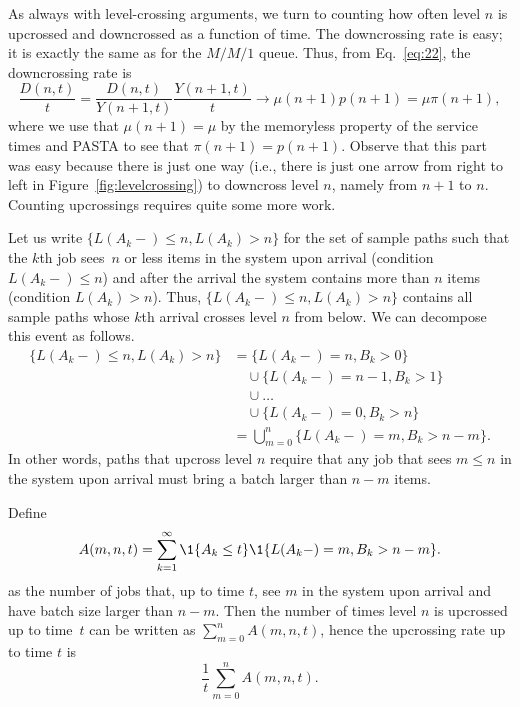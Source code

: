 As always with level-crossing arguments, we turn to counting how often
level $n$ is upcrossed and downcrossed as a function of time. The
downcrossing rate is easy; it is exactly the same as for the $M/M/1$
queue. Thus, from Eq.~\eqref{eq:22}, the downcrossing rate is
\begin{equation}
\frac{D(n,t)}t = \frac{D(n,t)}{Y(n+1,t)}\frac{Y(n+1,t)}t \to  \mu(n+1) p(n+1) = \mu \pi(n+1),
\end{equation}
where we use that $\mu(n+1) = \mu$ by the memoryless property of the
service times and PASTA to see that $\pi(n+1)=p(n+1)$.  Observe that
this part was easy because there is just one way (i.e., there is just
one arrow from right to left in Figure~\ref{fig:levelcrossing}) to
downcross level $n$, namely from $n+1$ to $n$. Counting upcrossings
requires quite some more work.

Let us write $\{L(A_k-) \leq n, L(A_k)>n\}$ for the set of sample
paths such that the $k$th job sees~$n$ or less items in the system
upon arrival (condition $L(A_k-)\leq n$) and after the arrival the
system contains more than $n$ items (condition $L(A_k) > n$). Thus,
$\{L(A_k-) \leq n, L(A_k)>n\}$ contains all sample paths whose $k$th
arrival crosses level $n$ from below. We can decompose this event as
follows.
\begin{equation*}
  \begin{split}
    \{L(A_k-) \leq n, L(A_k)>n\} 
&=  \{L(A_k-) =n , B_k >0\} \\
&\quad \cup  \{L(A_k-) =n-1 , B_k >1\} \\
&\quad \cup \ldots\\
&\quad \cup  \{L(A_k-) =0 , B_k > n\} \\
& = \bigcup_{m=0}^n \{L(A_k-) =m , B_k > n-m\}.
  \end{split}
\end{equation*}
In other words, paths that upcross level $n$ require that any job that
sees $m\leq n$ in the system upon arrival must bring a batch larger
than $n-m$ items.

Define 
\begin{equation*}
  A(m,n,t) = \sum_{k=1}^\infty \1{A_k \leq t}\1{L(A_k-) = m, B_k > n-m}.
\end{equation*}
as the number of jobs that, up to time $t$, see $m$ in the system upon
arrival and have batch size larger than $n-m$. Then the number of
times level $n$ is upcrossed up to time~$t$ can be written as
$\sum_{m=0}^n A(m,n,t)$, hence the upcrossing rate up to time $t$ is
\begin{equation*}
\frac 1t  \sum_{m=0}^n A(m,n,t).
\end{equation*}

